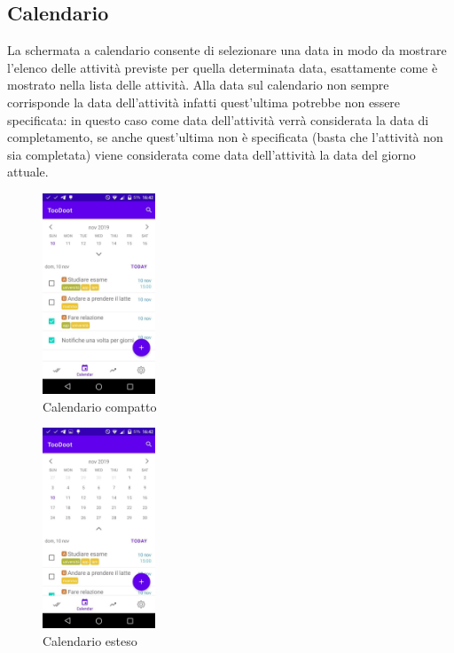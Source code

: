 \documentclass[]{article}
\begin{document}
\hypertarget{calendario}{%
\subsection{Calendario}\label{calendario}}

La schermata a calendario consente di selezionare una data in modo da
mostrare l'elenco delle attività previste per quella determinata data,
esattamente come è mostrato nella lista delle attività. Alla data sul
calendario non sempre corrisponde la data dell'attività infatti
quest'ultima potrebbe non essere specificata: in questo caso come data
dell'attività verrà considerata la data di completamento, se anche
quest'ultima non è specificata (basta che l'attività non sia completata)
viene considerata come data dell'attività la data del giorno attuale.

\begin{figure}
\centering
\includegraphics[width=0.3\textwidth,height=0.1\textheight]{./img/calendario_compatto.jpg}
\caption{Calendario compatto}
\end{figure}

\begin{figure}
\centering
\includegraphics[width=0.3\textwidth,height=0.1\textheight]{./img/calendario_esteso.jpg}
\caption{Calendario esteso}
\end{figure}
\end{document}
